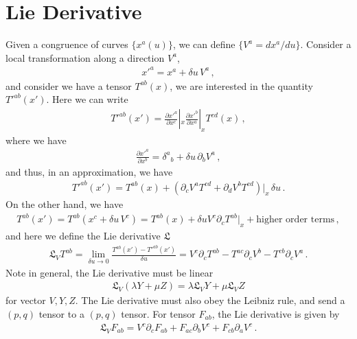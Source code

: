 \documentclass[11pt, onesided]{book}
\theoremstyle{break}
\theoremstyle{break}
\newcommand{\pd}{\partial}
\begin{document}
\section[Lie Derivative]{\color{red}Lie Derivative\color{black}}
Given a congruence of curves $\{x^a(u)\}$, we can define $\{V^a = dx^a/du\}$. Consider a local transformation along a direction $V^a$,
\begin{align*}
x'^a = x^a + \delta u \, V^a\,,
\end{align*}
and consider we have a tensor $T^{ab}(x)$, we are interested in the quantity $T'^{ab}(x')$. Here we can write
\begin{align*}
T'^{ab}(x') = \frac{\pd x'^a}{\pd x^c}|_{x} \frac{\pd x'^b}{\pd x^a}|_{x} T^{cd}(x)\,,
\end{align*}
where we have
\begin{align*}
\frac{\pd x'^a}{\pd x^b} = \delta^a{}_b + \delta u \, \pd_bV^a\,,
\end{align*}
and thus, in an approximation, we have
\begin{align*}
T'^{ab}(x') = T^{ab}(x) + \left( \pd_c V^a T^{cd} +\pd_d V^b T^{cd}\right)|_{x}\, \delta	 u\,.
\end{align*}
On the other hand, we have
\begin{align*}
T^{ab}(x') = T^{ab}(x^c+ \delta u\, V^c) = T^{ab}(x) + \delta u V^c\pd_cT^{ab}|_x + \text{higher order terms}\,,
\end{align*}
and here we define the Lie derivative $\mathfrak{L}$
\begin{align*}
\mathfrak{L}_VT^{ab} = \lim_{\delta u \to 0}\frac{T^{ab}(x') - T'^{ab}(x')}{\delta u} 
= V^c\pd_c T^{ab} - T^{ac}\pd_c V^b - T^{cb}\pd_c V^a\,.
\end{align*}
Note in general, the Lie derivative must be linear 
\begin{align*}
\mathfrak{L}_V(\lambda Y + \mu Z) = \lambda \mathfrak{L}_VY + \mu\mathfrak{L}_V Z
\end{align*}
for vector $V,Y,Z$. The Lie derivative must also obey the Leibniz rule, and send a $(p,q)$ tensor to a $(p,q)$ tensor. For tensor $F_{ab}$, the Lie derivative is given by
\begin{align*}
\mathfrak{L}_V F_{ab} = V^c \pd_c F_{ab} + F_{ac}\pd_b V^c + F_{cb}\pd_a V^c\,.
\end{align*}
\end{document}

